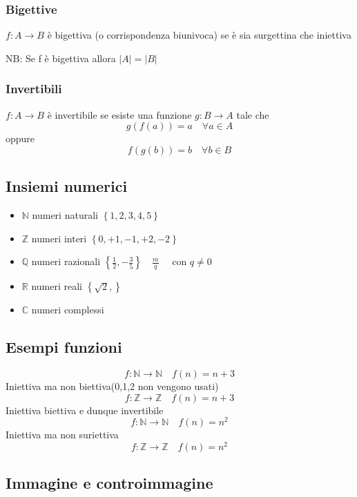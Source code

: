 \subsubsection{Bigettive}
\label{sub:bigettive}
$f: A \rightarrow B$ è bigettiva (o corrispondenza biunivoca) se è sia surgettina che iniettiva

NB: Se f è bigettiva allora $\left| A\right| = \left| B\right|$
\subsubsection{Invertibili}
\label{sub:invertibili}
$f: A \rightarrow B$ è invertibile se esiste una funzione $g: B \rightarrow A$ tale che
\[
	g\left( f\left( a \right)  \right) = a \quad  \forall a \in A
\]
oppure
\[
	f\left( g\left( b \right)  \right) = b \quad \forall b \in B
\]
\subsection{Insiemi numerici}
\label{sec:insieminumerici}

\begin{itemize}
	\item $\mathbb{N}$ numeri naturali $\left\{ 1,2,3,4,5 \right\} $
	\item $\mathbb{Z}$ numeri interi $\left\{ 0,+1,-1,+2,-2 \right\} $
	\item $\mathbb{Q}$ numeri razionali $\left\{ \frac{1}{2}, -\frac{3}{5} \right\} \quad \frac{m}{q} \quad \text{ con } q \neq 0$
	\item $\mathbb{R}$ numeri reali $\left\{ \sqrt{2},  \right\}  $
	\item $\mathbb{C}$ numeri complessi
\end{itemize}

\subsection{Esempi funzioni}
\label{sec:esempifunzioni}
\[
	f: \mathbb{N} \rightarrow \mathbb{N} \quad f\left( n \right) = n+3
\]
Iniettiva ma non biettiva(0,1,2 non vengono usati)
\[
	f: \mathbb{Z} \rightarrow \mathbb{Z} \quad f\left( n \right) = n+3
\]
Iniettiva biettiva e dunque invertibile
\[
	f: \mathbb{N} \rightarrow \mathbb{N} \quad f\left( n \right) = n^2
\]
Iniettiva ma non suriettiva
\[
	f: \mathbb{Z} \rightarrow \mathbb{Z} \quad f\left( n \right) = n^2
\]

\subsection{Immagine e controimmagine}
\label{sec:immagineecontroimmagine}

